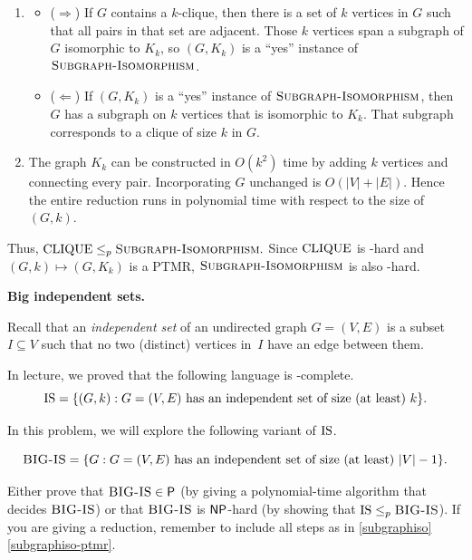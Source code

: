 \documentclass[11pt,addpoints,answers]{exam}
\newcommand{\ptimemap}{\leq_p}
\begin{document}
\begin{questions}
\begin{parts}
\begin{solution}
\begin{enumerate}[label=(\roman*)]
              \item 
              \begin{itemize}
                  \item ($\Rightarrow$) If $G$ contains a $k$-clique, then there is a set of $k$ vertices in $G$ such that all pairs in that set are adjacent. Those $k$ vertices span a subgraph of $G$ isomorphic to $K_k$, so $(G,K_k)$ is a “yes” instance of $\textsc{Subgraph-Isomorphism}$.
                  \item ($\Leftarrow$) If $(G,K_k)$ is a “yes” instance of $\textsc{Subgraph-Isomorphism}$, then $G$ has a subgraph on $k$ vertices that is isomorphic to $K_k$. That subgraph corresponds to a clique of size $k$ in $G$.
              \end{itemize}
          
              \item The graph $K_k$ can be constructed in $O(k^2)$ time by adding $k$ vertices and connecting every pair. Incorporating $G$ unchanged is $O(|V|+|E|)$. Hence the entire reduction runs in polynomial time with respect to the size of $(G,k)$.
            
            \end{enumerate}
            Thus, $\CLIQUE \ptimemap \subgraphiso.$ Since $\text{CLIQUE}$ is \NP-hard and $(G,k) \mapsto (G, K_k)$ is a PTMR, $\textsc{Subgraph-Isomorphism}$ is also \NP-hard.
            \end{solution}
      \end{parts}

      \pagebreak

  \question [8] \textbf{Big independent sets.} 

  Recall that an \emph{independent set} of an undirected graph $G=(V,E)$ is a subset $I \subseteq V$ such that no two (distinct) vertices in~$I$ have an edge between them.

  In lecture, we proved that the following language is \NP-complete.
  \[
    \text{IS} = \{(G,k) : G = (V,E) \text{ has an independent set of size (at least) } k\} .
  \]

  In this problem, we will explore the following variant of $\text{IS}$. 

    \newcommand{\BigIS}{\textsc{BIG-IS}}
    \[
      \BigIS = \set{ G : G=(V,E) \text{ has an independent set of size (at least) } |V|-1 } .
    \]
  
    Either prove that $\BigIS\in \P$ (by giving a polynomial-time algorithm that decides $\BigIS$) or that $\BigIS$ is $\mathsf{NP}$-hard (by showing that $\IS \ptimemap \BigIS$). If you are giving a reduction, remember to include all steps as in \cref{subgraphiso} \cref{subgraphiso-ptmr}.
    

\end{questions}
\end{document}
